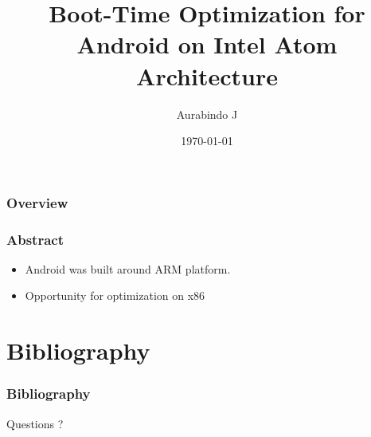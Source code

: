 \documentclass{beamer}
\title[x86 Boot Optimization]{Boot-Time Optimization for Android on Intel Atom Architecture}
\author{Aurabindo J}
\institute[SOIS]
{
	Manipal University \\
	\medskip
	\textit{mail@aurabindo.in}
}
\date{\today}
\begin{document}
\begin{frame}
	\titlepage
\end{frame}

\begin{frame}
	\frametitle{Overview}
	\tableofcontents
\end{frame}

\begin{frame}
	\frametitle{Abstract}
	\begin{itemize}
		\item Android was built around ARM platform.
		\item Opportunity for optimization on x86
	\end{itemize}

\end{frame}







\section{Bibliography}
\begin{frame}
	\frametitle{Bibliography}
	\nocite{*}
	
	
	\vspace{0.2cm}
	{\Huge{\centerline{Questions ?}}}
\end{frame}
\end{document}
